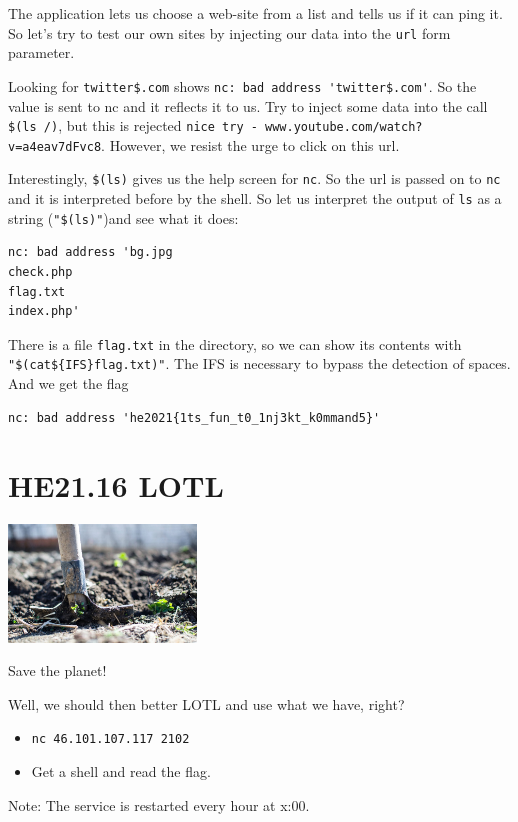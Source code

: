 \documentclass[english,a4paper,nols,noindent]{tufte-handout}
\begin{document}
\noindent The application lets us choose a web-site from a list and tells us if
it can ping it.  So let's try to test our own sites by injecting our data into
the \verb+url+ form parameter.

Looking for \verb+twitter$.com+ shows \verb+nc: bad address 'twitter$.com'+.
So the value is sent to nc and it reflects it to us.  Try to inject some data
into the call \verb+$(ls /)+, but this is rejected 
\verb+nice try - www.youtube.com/watch?v=a4eav7dFvc8+. However, we
resist the urge to click on this url.

Interestingly, \verb+$(ls)+ gives us the help screen for \verb+nc+.  So the url
is passed on to \verb+nc+ and it is interpreted before by the shell.  So let us
interpret the output of \verb+ls+ as a string (\verb+"$(ls)"+)and see what it
does:
\begin{verbatim}
nc: bad address 'bg.jpg
check.php
flag.txt
index.php'
\end{verbatim}

There is a file \verb+flag.txt+ in the directory, so we can show its contents
with \verb+"$(cat${IFS}flag.txt)"+.  The IFS is necessary to bypass the
detection of spaces.  And we get the flag

\begin{verbatim}
nc: bad address 'he2021{1ts_fun_t0_1nj3kt_k0mmand5}'
\end{verbatim}

\hypertarget{he21.16}{%
  \section{HE21.16 LOTL}
  \label{he21.16}}
\begin{marginfigure}
    \includegraphics[width=50mm]{images/challenge16.jpg}
\end{marginfigure}

Save the planet!

\noindent Well, we should then better LOTL and use what we have, right?
\begin{itemize}

\item \verb+nc 46.101.107.117 2102+
\item Get a shell and read the flag.
\end{itemize}
Note: The service is restarted every hour at x:00.
\end{document}
